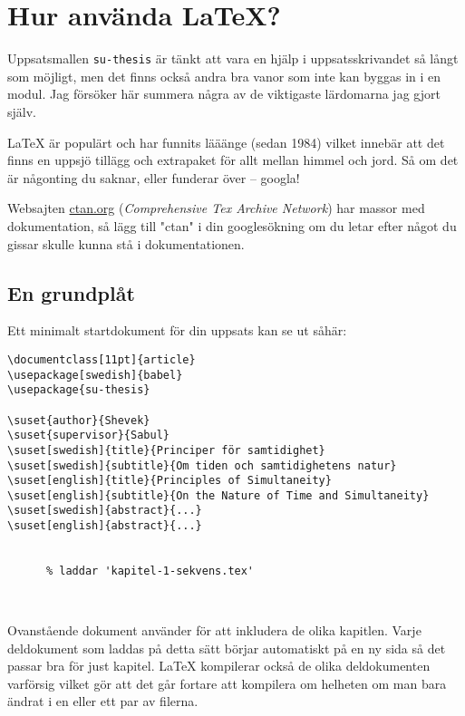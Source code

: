 
\section{Hur använda \LaTeX{}?}
\label{hur}

Uppsatsmallen \texttt{su-thesis} är tänkt att vara en hjälp i uppsatsskrivandet
så långt som möjligt, men det finns också andra bra vanor som inte kan byggas
in i en modul. Jag försöker här summera några av de viktigaste lärdomarna jag
gjort själv.

\LaTeX{} är populärt och har funnits lääänge (sedan 1984) vilket innebär att
det finns en uppsjö tillägg och extrapaket för allt mellan himmel och jord. Så
om det är någonting du saknar, eller funderar över -- googla!

Websajten \href{https://ctan.org/}{\url{ctan.org}} (\emph{Comprehensive Tex
  Archive Network}) har massor med dokumentation, så lägg till "ctan" i din
googlesökning om du letar efter något du gissar skulle kunna stå i
dokumentationen.


\subsection{En grundplåt}
\label{grundplåt}

Ett minimalt startdokument för din uppsats kan se ut såhär:

\begin{verbatim}
\documentclass[11pt]{article}
\usepackage[swedish]{babel}
\usepackage{su-thesis}

\suset{author}{Shevek}
\suset{supervisor}{Sabul}
\suset[swedish]{title}{Principer för samtidighet}
\suset[swedish]{subtitle}{Om tiden och samtidighetens natur}
\suset[english]{title}{Principles of Simultaneity}
\suset[english]{subtitle}{On the Nature of Time and Simultaneity}
\suset[swedish]{abstract}{...}
\suset[english]{abstract}{...}


      % laddar 'kapitel-1-sekvens.tex'



\end{verbatim}

Ovanstående dokument använder  för att inkludera de olika
kapitlen. Varje deldokument som laddas på detta sätt börjar automatiskt på en
ny sida så det passar bra för just kapitel. \LaTeX{} kompilerar också de olika
deldokumenten varförsig vilket gör att det går fortare att kompilera om
helheten om man bara ändrat i en eller ett par av filerna.

